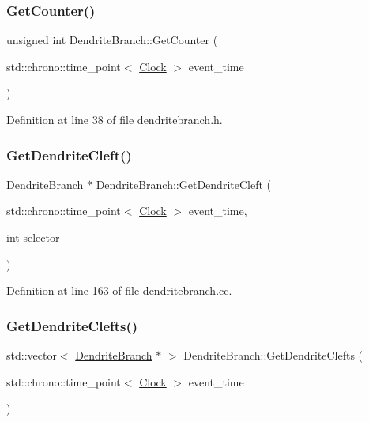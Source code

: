 \subsubsection{\texorpdfstring{Get\+Counter()}{GetCounter()}}
{\footnotesize\ttfamily unsigned int Dendrite\+Branch\+::\+Get\+Counter (\begin{DoxyParamCaption}\item[{std\+::chrono\+::time\+\_\+point$<$ \mbox{\hyperlink{universe_8h_a0ef8d951d1ca5ab3cfaf7ab4c7a6fd80}{Clock}} $>$}]{event\+\_\+time }\end{DoxyParamCaption})\hspace{0.3cm}{\ttfamily [inline]}}



Definition at line 38 of file dendritebranch.\+h.

\mbox{\label{class_dendrite_branch_a11f25ffce77011afad909acb593d2e42}} 
\subsubsection{\texorpdfstring{Get\+Dendrite\+Cleft()}{GetDendriteCleft()}}
{\footnotesize\ttfamily \mbox{\hyperlink{class_dendrite_branch}{Dendrite\+Branch}} $\ast$ Dendrite\+Branch\+::\+Get\+Dendrite\+Cleft (\begin{DoxyParamCaption}\item[{std\+::chrono\+::time\+\_\+point$<$ \mbox{\hyperlink{universe_8h_a0ef8d951d1ca5ab3cfaf7ab4c7a6fd80}{Clock}} $>$}]{event\+\_\+time,  }\item[{int}]{selector }\end{DoxyParamCaption})}



Definition at line 163 of file dendritebranch.\+cc.

\mbox{\label{class_dendrite_branch_a2be44a81b4b5213947e9545400a0453c}} 
\subsubsection{\texorpdfstring{Get\+Dendrite\+Clefts()}{GetDendriteClefts()}}
{\footnotesize\ttfamily std\+::vector$<$ \mbox{\hyperlink{class_dendrite_branch}{Dendrite\+Branch}} $\ast$ $>$ Dendrite\+Branch\+::\+Get\+Dendrite\+Clefts (\begin{DoxyParamCaption}\item[{std\+::chrono\+::time\+\_\+point$<$ \mbox{\hyperlink{universe_8h_a0ef8d951d1ca5ab3cfaf7ab4c7a6fd80}{Clock}} $>$}]{event\+\_\+time }\end{DoxyParamCaption})}



